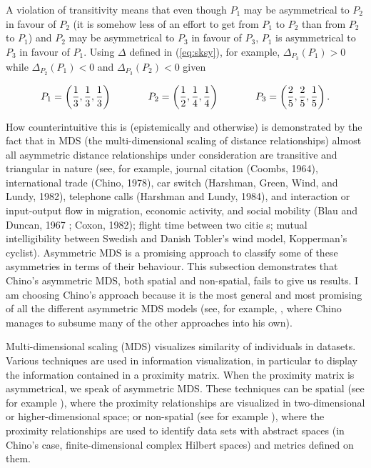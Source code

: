 \documentclass[11pt]{article}
\begin{document}
A violation of transitivity means that even though $P_{1}$ may be
asymmetrical to $P_{2}$ in favour of $P_{2}$ (it is somehow less of an
effort to get from $P_{1}$ to $P_{2}$ than from $P_{2}$ to $P_{1}$)
and $P_{2}$ may be asymmetrical to $P_{3}$ in favour of $P_{3}$,
$P_{1}$ is asymmetrical to $P_{3}$ in favour of $P_{1}$. Using
$\Delta$ defined in (\ref{eq:sksy}), for example,
$\Delta_{P_{3}}(P_{1})>0$ while $\Delta_{P_{2}}(P_{1})<0$ and
$\Delta_{P_{3}}(P_{2})<0$ given

\begin{equation}
  \label{eq:transviol}
    P_{1}=\left(\frac{1}{3},\frac{1}{3},\frac{1}{3}\right) \hspace{.5in}
    P_{2}=\left(\frac{1}{2},\frac{1}{4},\frac{1}{4}\right)  \hspace{.5in}
    P_{3}=\left(\frac{2}{5},\frac{2}{5},\frac{1}{5}\right).
\end{equation}

How counterintuitive this is (epistemically and otherwise) is
demonstrated by the fact that in MDS (the multi-dimensional scaling of
distance relationships) almost all asymmetric distance relationships
under consideration are transitive and triangular in nature (see, for
example, journal citation (Coombs, 1964), international trade (Chino,
1978), car switch (Harshman, Green, Wind, and Lundy, 1982), telephone
calls (Harshman and Lundy, 1984), and interaction or input-output flow
in migration, economic activity, and social mobility (Blau and Duncan,
1967 ; Coxon, 1982); flight time between two citie
s; mutual intelligibility between Swedish
and Danish  Tobler's wind model,
Kopperman's cyclist). Asymmetric MDS is a promising approach to
classify some of these asymmetries in terms of their behaviour. This
subsection demonstrates that Chino's asymmetric MDS, both spatial and
non-spatial, fails to give us results. I am choosing Chino's approach
because it is the most general and most promising of all the different
asymmetric MDS models (see, for example, ,
where Chino manages to subsume many of the other approaches into his
own). 

Multi-dimensional scaling (MDS) visualizes similarity of individuals
in datasets. Various techniques are used in information visualization,
in particular to display the information contained in a proximity
matrix. When the proximity matrix is asymmetrical, we speak of
asymmetric MDS. These techniques can be spatial (see for example
), where the proximity relationships are
visualized in two-dimensional or higher-dimensional space; or
non-spatial (see for example ), where the
proximity relationships are used to identify data sets with abstract
spaces (in Chino's case, finite-dimensional complex Hilbert spaces)
and metrics defined on them.
\end{document}
